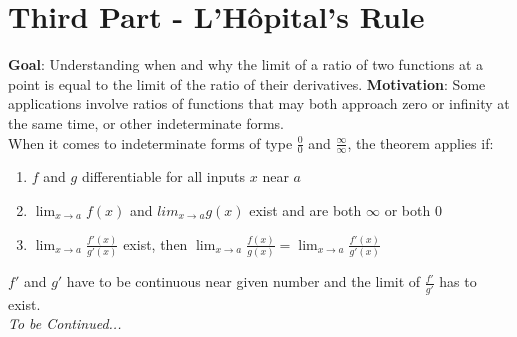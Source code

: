 \documentclass[12pt, letterpaper]{article}
\begin{document}
\section{Third Part - L'Hôpital's Rule}
\textbf{Goal}: Understanding when and why the limit of a ratio of two functions at a point is equal to the limit of the ratio of their derivatives.
\textbf{Motivation}: Some applications involve ratios of functions that may both approach zero or infinity at the same time, or other indeterminate forms.\\
\newline
When it comes to indeterminate forms of type \(\frac{0}{0}\) and \(\frac{\infty}{\infty}\), the theorem applies if:
\begin{enumerate}
    \item \(f\) and \(g\) differentiable for all inputs \(x\) near \(a\)
    \item \(\lim_{x \to a} f(x)\) and \(lim_{x \to a} g(x)\) exist and are both \(\infty\) or both \(0\)
    \item \(\lim_{x \to a}\frac{f'(x)}{g'(x)}\) exist, then \(\lim_{x \to a}\frac{f(x)}{g(x)} = \lim_{x \to a}\frac{f'(x)}{g'(x)}\) 
\end{enumerate}
\(f'\) and \(g'\) have to be continuous near given number and the limit of \(\frac{f'}{g'}\) has to exist.\\
\newline
\textit{To be Continued...}








 
\end{document}
